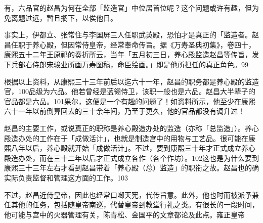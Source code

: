 \vfill
\begin{BookNotes}
\end{BookNotes}

\noindent 有，六品官的赵昌为何在全部「监造官」中位居首位呢？这个问题或许有趣，但为免离题过远，暂且搁下，以俟他日。

事实上，伊都立、张常住与李国屏三人任职武英殿，恐怕才是真正的「监造者。赵昌任职于养心殿，但因常侍皇帝，经常奉命传旨。据《万寿圣典初集》，卷四十，康熙五十二年王原祁的奏折所云，当年「五月初三日，养心殿监造赵昌等传旨，发下兵部右侍郎宋骏业所画万寿图稿，命臣绘画。」即是他所担任的真正角色。99

根据以上资料，从康熙三十三年前后以迄六十一年，赵昌的职务都是养心殿的监造官，100品级为六品。他若曾经是蓝翎侍卫，该职一般也是六品。赵昌大半辈子的官品都是六品。101果尔，这便是一个有趣的问题了！如资料所示，他至少在康熙六十一年以前倒算回去的三十余年间，乃至于更久，他的官品都没有调升过！

赵昌的主要工作，或说真正的职称是养心殿造办处的监造（亦称「总监造」）。养心殿造办处的工作在于「成做活计」，也就是制造宫中的用物与工艺品。很可能在康熙八年以后，养心殿就开始「成做活计」。不过，要到康熙三十年才正式成立养心殿造办处，而在三十二年以后才正式成立各作（各个作坊）。102这也是为什么要到康熙三十三年左右才看到赵昌带着「养心殿（总）监造」的职衔之故。赵昌也的确实际负责监督和管理这方面的工作。103

不过，赵昌近侍皇帝，因此也经常口啣天宪，代传旨意。此外，他也时而被派予兼任其他的任务，包括随皇帝南巡，代替皇帝到教堂行礼之类。有很长的一段时间，他可能与宫中的火器管理有关，陈青松、金国平的文章都论及此点。雍正皇帝

\vfill
\begin{BookNotes}
\end{BookNotes}

